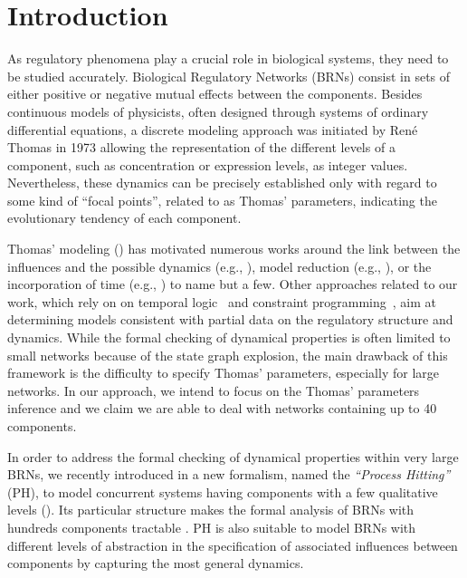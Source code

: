 \section{Introduction}
As regulatory phenomena play a crucial role in biological systems, they need to be studied accurately.
Biological Regulatory Networks (BRNs) consist in sets of either positive or negative mutual effects between the components.
Besides continuous models of physicists, often designed through systems of ordinary
differential equations, a discrete modeling approach was initiated by René Thomas in 1973
\cite{Thomas73} allowing the representation of the different levels of a component, such as concentration or expression levels, as integer values.
Nevertheless, these dynamics can be precisely established only with regard to some kind of ``focal points'', related to as Thomas' parameters, indicating the evolutionary tendency of each component.

Thomas' modeling () has motivated numerous works around the link between the influences
and the possible dynamics (e.g., \cite{RiCo07}), %
model reduction (e.g., \cite{Naldi09}), %
or the incorporation of time (e.g., \cite{Siebert06}) %
to name but a few.
Other approaches related to our work, which rely on on temporal logic~\cite{Khalis09} and constraint programming~\cite{20646302,DBLP:conf/ipcat/CorblinFTCT12},
aim at determining models consistent with partial data on the regulatory structure and dynamics.
While the formal checking of dynamical properties is often limited to small networks because of the
state graph explosion, the main drawback of this framework is the difficulty to specify Thomas'
parameters, especially for large networks.
In our approach, we intend to focus on the Thomas' parameters inference and we claim we are able to deal with networks containing up to 40 components.

In order to address the formal checking of dynamical properties within very large BRNs, we recently
introduced in \cite{PMR10-TCSB} a new formalism, named the \emph{``Process Hitting''} (PH), to model
concurrent systems having components with a few qualitative levels ().
Its particular structure makes the formal analysis of BRNs with hundreds components tractable \cite{PMR12-MSCS}.
PH is also suitable to model BRNs with different levels of abstraction in the specification of
associated influences between components by capturing the most general dynamics.

